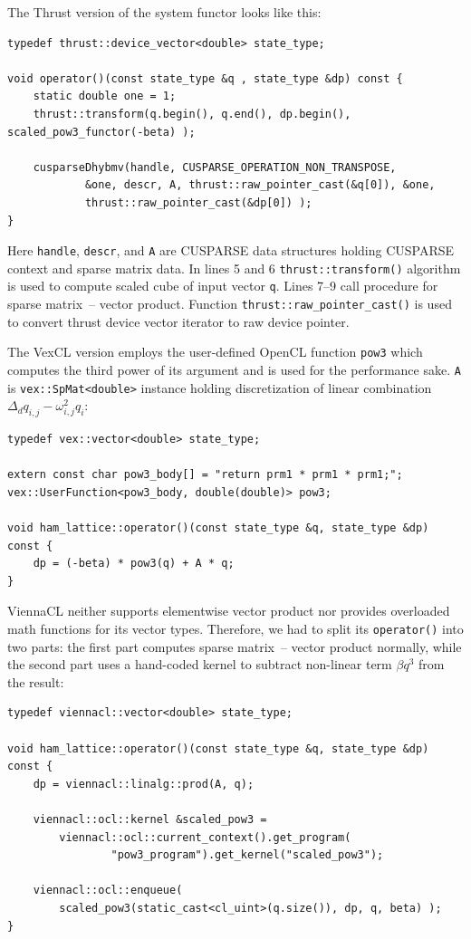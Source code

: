 \documentclass[final]{siamltex}
\newcommand{\code}[1]{\lstinline|#1|}
\begin{document}
The Thrust version of the system functor looks like this:
\begin{lstlisting}
typedef thrust::device_vector<double> state_type;

void operator()(const state_type &q , state_type &dp) const {
    static double one = 1;
    thrust::transform(q.begin(), q.end(), dp.begin(), scaled_pow3_functor(-beta) );

    cusparseDhybmv(handle, CUSPARSE_OPERATION_NON_TRANSPOSE,
            &one, descr, A, thrust::raw_pointer_cast(&q[0]), &one,
            thrust::raw_pointer_cast(&dp[0]) );
}
\end{lstlisting}
Here \code{handle}, \code{descr}, and \code{A} are CUSPARSE data structures
holding CUSPARSE context and sparse matrix data. In lines 5 and 6
\code{thrust::transform()} algorithm is used to compute scaled cube of input
vector \code{q}. Lines 7--9 call procedure for sparse matrix~-- vector product.
Function \code{thrust::raw_pointer_cast()} is used to convert thrust device
vector iterator to raw device pointer.

The VexCL version employs the user-defined OpenCL function \code{pow3} which
computes the third power of its argument and is used for the performance sake.
\code{A} is \code{vex::SpMat<double>} instance holding discretization of linear
combination $\Delta_d q_{i,j} - \omega^2_{i,j}q_i$:
\begin{lstlisting}
typedef vex::vector<double> state_type;

extern const char pow3_body[] = "return prm1 * prm1 * prm1;";
vex::UserFunction<pow3_body, double(double)> pow3;

void ham_lattice::operator()(const state_type &q, state_type &dp) const {
    dp = (-beta) * pow3(q) + A * q;
}
\end{lstlisting}

ViennaCL neither supports elementwise vector product nor provides
overloaded math functions for its vector types. Therefore, we had to split its
\code{operator()} into two parts: the first part computes sparse matrix~--
vector product normally, while the second part uses a hand-coded kernel to
subtract non-linear term $\beta q^3$ from the result:
\begin{lstlisting}
typedef viennacl::vector<double> state_type;

void ham_lattice::operator()(const state_type &q, state_type &dp) const {
    dp = viennacl::linalg::prod(A, q);

    viennacl::ocl::kernel &scaled_pow3 =
        viennacl::ocl::current_context().get_program(
                "pow3_program").get_kernel("scaled_pow3");

    viennacl::ocl::enqueue(
        scaled_pow3(static_cast<cl_uint>(q.size()), dp, q, beta) );
}
\end{lstlisting}
\end{document}
